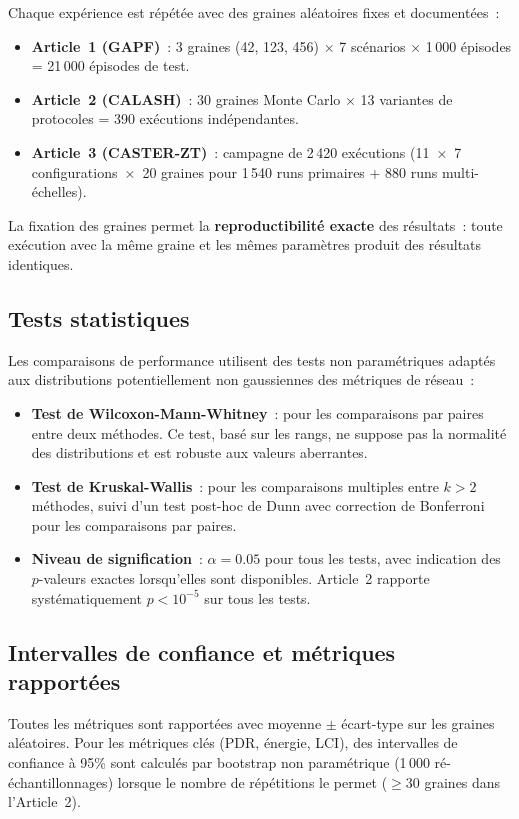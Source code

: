 Chaque expérience est répétée avec des graines aléatoires fixes et documentées~:
\begin{itemize}
    \item \textbf{Article~1 (GAPF)}~: 3 graines (42, 123, 456) $\times$ 7 scénarios $\times$ 1\,000 épisodes = 21\,000 épisodes de test.
    \item \textbf{Article~2 (CALASH)}~: 30 graines Monte Carlo $\times$ 13 variantes de protocoles = 390 exécutions indépendantes.
    \item \textbf{Article~3 (CASTER-ZT)}~: campagne de 2\,420 exécutions (11~×~7 configurations~×~20 graines pour 1\,540 runs primaires + 880 runs multi-échelles).
\end{itemize}
La fixation des graines permet la \textbf{reproductibilité exacte} des résultats~: toute exécution avec la même graine et les mêmes paramètres produit des résultats identiques.

\subsection{Tests statistiques}

Les comparaisons de performance utilisent des tests non paramétriques adaptés aux distributions potentiellement non gaussiennes des métriques de réseau~:
\begin{itemize}
    \item \textbf{Test de Wilcoxon-Mann-Whitney}~: pour les comparaisons par paires entre deux méthodes. Ce test, basé sur les rangs, ne suppose pas la normalité des distributions et est robuste aux valeurs aberrantes.
    \item \textbf{Test de Kruskal-Wallis}~: pour les comparaisons multiples entre $k > 2$ méthodes, suivi d'un test post-hoc de Dunn avec correction de Bonferroni pour les comparaisons par paires.
    \item \textbf{Niveau de signification}~: $\alpha = 0.05$ pour tous les tests, avec indication des $p$-valeurs exactes lorsqu'elles sont disponibles. Article~2 rapporte systématiquement $p < 10^{-5}$ sur tous les tests.
\end{itemize}

\subsection{Intervalles de confiance et métriques rapportées}

Toutes les métriques sont rapportées avec moyenne $\pm$ écart-type sur les graines aléatoires. Pour les métriques clés (PDR, énergie, LCI), des intervalles de confiance à 95\% sont calculés par bootstrap non paramétrique (1\,000 ré-échantillonnages) lorsque le nombre de répétitions le permet ($\geq 30$ graines dans l'Article~2).


